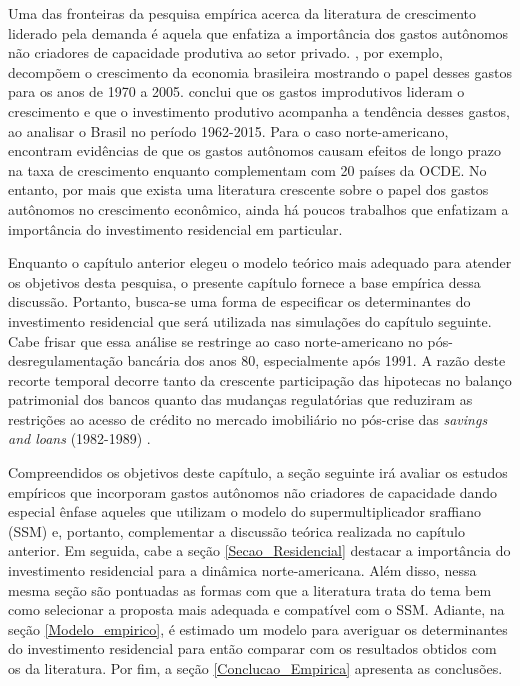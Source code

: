 Uma das fronteiras da pesquisa empírica acerca da literatura de crescimento liderado pela demanda é aquela que enfatiza a importância dos gastos autônomos não criadores de capacidade produtiva ao setor privado. \textcite{freitas_pattern_2013}, por exemplo, decompõem o crescimento da economia brasileira mostrando o papel desses gastos para os anos de  1970 a 2005. \textcite{braga_investment_2018} conclui que os gastos improdutivos lideram o crescimento e que o investimento produtivo acompanha a tendência desses gastos, ao analisar o Brasil no período 1962-2015. Para o caso norte-americano, \textcite{girardi_long-run_2016} encontram evidências de que os gastos autônomos causam efeitos de longo prazo na taxa de crescimento enquanto \textcite{girardi_autonomous_2018} complementam com 20 países da OCDE. No entanto, por mais que exista uma literatura crescente sobre o papel dos gastos autônomos no crescimento econômico, ainda há poucos trabalhos que enfatizam a importância do investimento residencial em particular. 

Enquanto o capítulo anterior elegeu o modelo teórico mais adequado para atender os objetivos desta pesquisa, o presente capítulo fornece a base empírica dessa discussão. Portanto, busca-se uma forma de especificar os determinantes do investimento residencial que será utilizada nas simulações do capítulo seguinte. 
Cabe frisar que essa análise se restringe ao caso norte-americano no pós-desregulamentação bancária dos anos 80, especialmente após 1991. 
A razão deste recorte temporal decorre tanto da crescente participação das hipotecas no balanço patrimonial dos bancos \cite{jorda_great_2014} quanto das mudanças regulatórias que reduziram as restrições ao acesso de crédito no mercado imobiliário no pós-crise das \textit{savings and loans} (1982-1989) \cites{linneman_impacts_1989}{duca_empirical_1991}{federal_deposit_insurance_corporation_savings_1997}. 

Compreendidos os objetivos deste capítulo, a seção seguinte irá avaliar os estudos empíricos que incorporam gastos autônomos não criadores de capacidade dando especial ênfase aqueles que utilizam o modelo do supermultiplicador sraffiano (SSM) e, portanto, complementar a discussão teórica realizada no capítulo anterior. 
Em seguida, cabe a seção \ref{Secao_Residencial} destacar a importância do investimento residencial para a dinâmica norte-americana. Além disso, nessa mesma seção são pontuadas as formas com que a literatura trata do tema bem como selecionar a proposta mais adequada e compatível com o SSM. 
Adiante, na seção \ref{Modelo_empirico}, é estimado um modelo  para averiguar os determinantes do investimento residencial para então comparar com os resultados obtidos com os da literatura. Por fim, a seção \ref{Conclucao_Empirica} apresenta as conclusões.